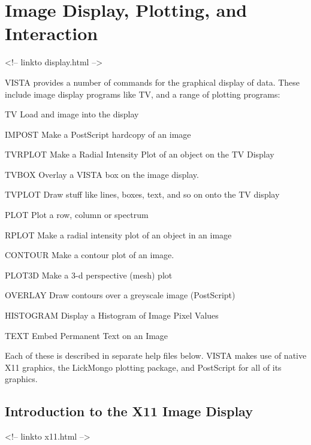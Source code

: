 \chapter{Image Display, Plotting, and Interaction}
\begin{rawhtml}
<!-- linkto display.html -->
\end{rawhtml}

%
%
%

VISTA provides a number of commands for the graphical display of data.
These include image display programs like TV, and a range of plotting
programs:
\begin{example} 
  \item[TV\hfill]{Load and image into the display}
  \item[IMPOST\hfill]{Make a PostScript hardcopy of an image}
  \item[TVRPLOT\hfill]{Make a Radial Intensity Plot of an object on the 
       TV Display}
  \item[TVBOX\hfill]{Overlay a VISTA box on the image display.}
  \item[TVPLOT \hfill]{Draw stuff like lines, boxes, text, and so on onto the 
       TV display}
  \item[PLOT\hfill]{Plot a row, column or spectrum}
  \item[RPLOT\hfill]{Make a radial intensity plot of an object in an image}
  \item[CONTOUR\hfill]{Make a contour plot of an image.}
  \item[PLOT3D\hfill]{Make a 3-d perspective (mesh) plot}
  \item[OVERLAY\hfill]{Draw contours over a greyscale image (PostScript)}
  \item[HISTOGRAM\hfill]{Display a Histogram of Image Pixel Values}
  \item[TEXT\hfill]{Embed Permanent Text on an Image}
\end{example} 
Each of these is described in separate help files below.  VISTA makes use
of native X11 graphics, the LickMongo plotting package, and PostScript for
all of its graphics.

\section{Introduction to the X11 Image Display}
\begin{rawhtml}
<!-- linkto x11.html -->
\end{rawhtml}

